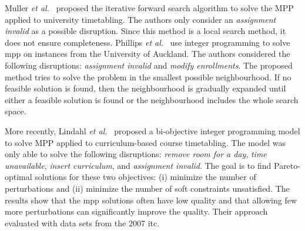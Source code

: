 \documentclass[runningheads]{llncs}
\begin{document}

Muller \emph{et al.}~\cite{DBLP:conf/patat/MullerRB04} proposed the iterative forward search algorithm to solve the MPP applied to university timetabling. The authors only consider an \textit{assignment invalid} as a possible disruption. Since this method is a local search method, it does not ensure completeness. Phillips \emph{et al.}~\cite{APhillips2017} use integer programming to solve \gls{mpp} on instances from the University of Auckland. The authors considered the following disruptions: \textit{assignment invalid} and \textit{modify enrollments}. The proposed method tries to solve the problem in the smallest possible neighbourhood. If no feasible solution is found, then the neighbourhood is gradually expanded until either a feasible solution is found or the neighbourhood includes the whole search space. 

More recently, Lindahl \emph{et al.}~\cite{LINDAHL2019} proposed a bi-objective integer programming model to solve MPP applied to curriculum-based course timetabling. The model was only able to solve the following disruptions: \textit{remove room for a day}, \textit{time unavailable}, \textit{insert curriculum}, and \textit{assignment invalid}. The goal is to find Pareto-optimal solutions for these two objectives: (i) minimize the number of perturbations and (ii) minimize the number of soft constraints unsatisfied. The results show that the \gls{mpp} solutions often have low quality and that allowing  few more perturbations can significantly improve the quality. Their approach evaluated with data sets from the 2007 \gls{itc}. 
\end{document}
